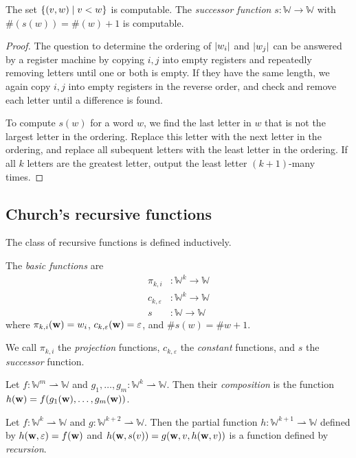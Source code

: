 \begin{theorem}
	The set \( \qty{(v,w) \mid v < w} \) is computable.
	The \emph{successor function} \( s \colon \mathbb W \to \mathbb W \) with \( \#(s(w)) = \#(w)+1 \) is computable.
\end{theorem}
\begin{proof}
	The question to determine the ordering of \( \abs{w_i} \) and \( \abs{w_j} \) can be answered by a register machine by copying \( i, j \) into empty registers and repeatedly removing letters until one or both is empty.
	If they have the same length, we again copy \( i, j \) into empty registers in the reverse order, and check and remove each letter until a difference is found.

	To compute \( s(w) \) for a word \( w \), we find the last letter in \( w \) that is not the largest letter in the ordering.
	Replace this letter with the next letter in the ordering, and replace all subequent letters with the least letter in the ordering.
	If all \( k \) letters are the greatest letter, output the least letter \( (k + 1) \)-many times.
\end{proof}

\subsection{Church's recursive functions}
The class of recursive functions is defined inductively.
\begin{definition}
	The \emph{basic functions} are
	\begin{align*}
		\pi_{k,i} &\colon \mathbb W^k \to \mathbb W \\
		c_{k,\varepsilon} &\colon \mathbb W^k \to \mathbb W \\
		s &\colon \mathbb W \to \mathbb W
	\end{align*}
	where \( \pi_{k,i}(\vb w) = w_i \), \( c_{k,\varepsilon}(\vb w) = \varepsilon \), and \( \# s(w) = \# w + 1 \).
\end{definition}
We call \( \pi_{k,i} \) the \emph{projection} functions, \( c_{k,\varepsilon} \) the \emph{constant} functions, and \( s \) the \emph{successor} function.

Let \( f \colon \mathbb W^m \rightharpoonup \mathbb W \) and \( g_1, \dots, g_m \colon \mathbb W^k \rightharpoonup \mathbb W \).
Then their \emph{composition} is the function \( h(\vb w) = f(g_1(\vb w), \dots, g_m(\vb w)) \).

Let \( f \colon \mathbb W^k \rightharpoonup \mathbb W \) and \( g \colon \mathbb W^{k+2} \rightharpoonup \mathbb W \).
Then the partial function \( h \colon \mathbb W^{k+1} \rightharpoonup \mathbb W \) defined by \( h(\vb w, \varepsilon) = f(\vb w) \) and \( h(\vb w, s(v)) = g(\vb w, v, h(\vb w, v)) \) is a function defined by \emph{recursion}.

